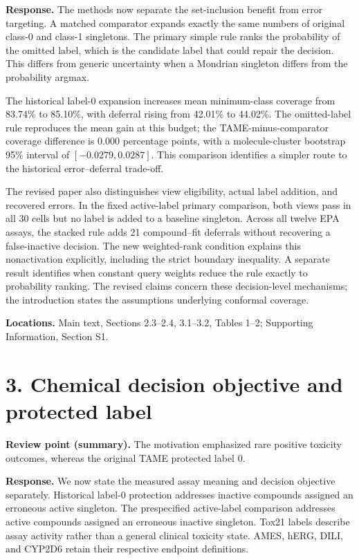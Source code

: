 \textbf{Response.} The methods now separate the set-inclusion benefit from error targeting. A matched comparator expands exactly the same numbers of original class-0 and class-1 singletons. The primary simple rule ranks the probability of the omitted label, which is the candidate label that could repair the decision. This differs from generic uncertainty when a Mondrian singleton differs from the probability argmax.

The historical label-0 expansion increases mean minimum-class coverage from 83.74\% to 85.10\%, with deferral rising from 42.01\% to 44.02\%. The omitted-label rule reproduces the mean gain at this budget; the TAME-minus-comparator coverage difference is 0.000 percentage points, with a molecule-cluster bootstrap 95\% interval of $[-0.0279,0.0287]$. This comparison identifies a simpler route to the historical error--deferral trade-off.

The revised paper also distinguishes view eligibility, actual label addition, and recovered errors. In the fixed active-label primary comparison, both views pass in all 30 cells but no label is added to a baseline singleton. Across all twelve EPA assays, the stacked rule adds 21 compound--fit deferrals without recovering a false-inactive decision. The new weighted-rank condition explains this nonactivation explicitly, including the strict boundary inequality. A separate result identifies when constant query weights reduce the rule exactly to probability ranking. The revised claims concern these decision-level mechanisms; the introduction states the assumptions underlying conformal coverage.

\textbf{Locations.} Main text, Sections 2.3--2.4, 3.1--3.2, Tables 1--2; Supporting Information, Section S1.

\section*{3. Chemical decision objective and protected label}
\noindent\textbf{Review point (summary).} The motivation emphasized rare positive toxicity outcomes, whereas the original TAME protected label 0.

\textbf{Response.} We now state the measured assay meaning and decision objective separately. Historical label-0 protection addresses inactive compounds assigned an erroneous active singleton. The prespecified active-label comparison addresses active compounds assigned an erroneous inactive singleton. Tox21 labels describe assay activity rather than a general clinical toxicity state. AMES, hERG, DILI, and CYP2D6 retain their respective endpoint definitions.

